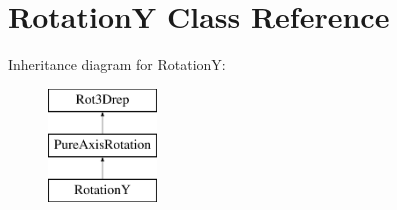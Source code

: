 \hypertarget{classRotationY}{}\section{RotationY Class Reference}
\label{classRotationY}
Inheritance diagram for RotationY\+:\begin{figure}[H]
\begin{center}
\leavevmode
\includegraphics[height=3.000000cm]{classRotationY}
\end{center}
\end{figure}
